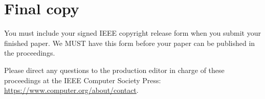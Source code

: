 \documentclass[10pt,twocolumn,letterpaper]{article}
\begin{document}
\section{Final copy}

You must include your signed IEEE copyright release form when you submit your finished paper.
We MUST have this form before your paper can be published in the proceedings.

Please direct any questions to the production editor in charge of these proceedings at the IEEE Computer Society Press:
\url{https://www.computer.org/about/contact}.


{\small


}
\end{document}
